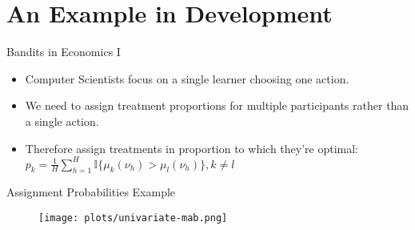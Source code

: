 \documentclass[aspectratio=169,xcolor=dvipsnames]{beamer}
\begin{document}
\section{An Example in Development}
\begin{frame}{Bandits in Economics I}
    \begin{itemize}
        \item Computer Scientists focus on a single learner choosing one action.
        \item We need to assign treatment proportions for multiple participants rather 
        than a single action.
        \item Therefore assign treatments in proportion to which they're optimal:
        $p_k = \frac{1}{H} \sum^H_{h=1} \mathbb{I}\{\mu_k(\nu_{h})  > \mu_l(\nu_{h}) \}, k \neq l$
    \end{itemize}
\end{frame}



\begin{frame}{Assignment Probabilities Example} 

\begin{figure}[htbp]
    \centering
    \texttt{[image: plots/univariate-mab.png]} 
\end{figure}    

\end{frame}
\end{document}
